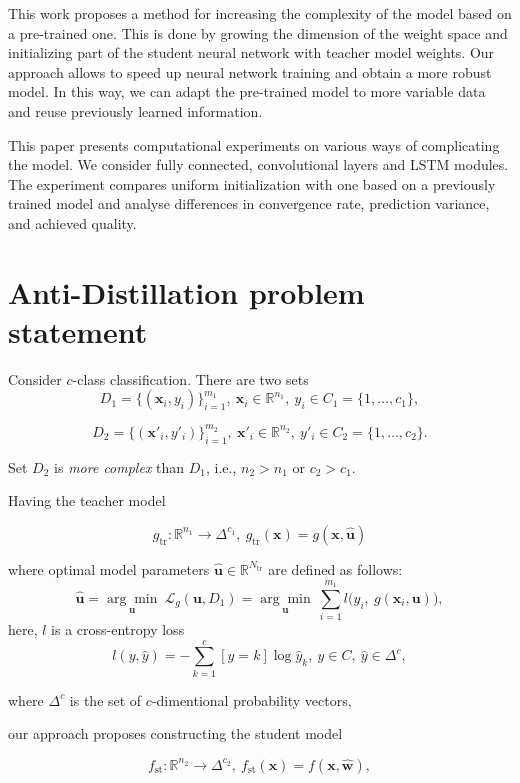\documentclass[80pt]{article}
\begin{document}
This work proposes a method for increasing the complexity of the model based on a pre-trained one. This is done by growing the dimension of the weight space and initializing part of the student neural network with teacher model weights. Our approach allows to speed up neural network training and obtain a more robust model. In this way, we can adapt the pre-trained model to more variable data and reuse previously learned information.

This paper presents computational experiments on various ways of complicating the model. We consider fully connected, convolutional layers and LSTM modules. The experiment compares uniform initialization with one based on a previously trained model and analyse differences in convergence rate, prediction variance, and achieved quality.

\section{Anti-Distillation problem statement}
Consider $c$-class classification. There are two sets
$$D_1 = \{(\mathbf{x}_i, y_i)\}_{i=1}^{m_1},~\mathbf{x}_i \in \mathbb{R}^{n_1},~y_i \in C_1 = \{1, \dots, c_1\},$$

$$D_2 =  \{(\mathbf{x}'_i, y'_i)\}_{i=1}^{m_2},~\mathbf{x}'_i \in \mathbb{R}^{n_2},~y'_i \in C_2 = \{1, \dots, c_2\}.$$

Set $D_2$ is \textit{more complex} than $D_1$, i.e., $n_2 > n_1$ or $c_2 > c_1$.

Having the teacher model 

\[g_\text{tr}: \mathbb{R}^{n_1} \rightarrow \Delta^{c_1},~g_\text{tr}(\mathbf{x}) = g(\mathbf{x}, \hat{\mathbf{u}})\] 

where optimal model parameters $\hat{\mathbf{u}} \in \mathbb{R}^{N_{\text{tr}}}$ are defined as follows:
$$\hat{\mathbf{u}} =  \underset{\mathbf{u}}{\arg\min}~\mathcal{L}_g(\mathbf{u}, D_1) =\underset{\mathbf{u}}{\arg\min}~\sum\limits_{i=1}^{m_1} l \bigl(y_i,~g(\mathbf{x}_i, \mathbf{u})\bigr),$$
here, $l$ is a cross-entropy loss 
$$l(y, \hat{y}) = -\sum\limits_{k=1}^{c} [y = k] \log{\hat{y}_k},~y \in C,~\hat{y} \in \Delta^c,$$

where $\Delta^c$ is the set of $c$-dimentional probability vectors,

our approach proposes constructing the student model

\[f_\text{st}: \mathbb{R}^{n_2} \rightarrow \Delta^{c_2},~f_\text{st}(\mathbf{x}) = f(\mathbf{x}, \hat{\mathbf{w}}),\]
\end{document}
